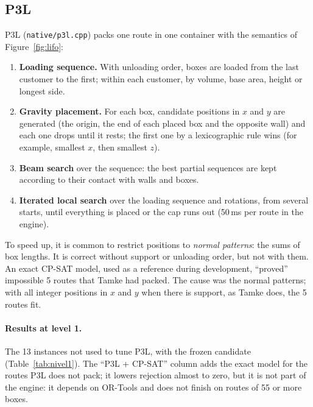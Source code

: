 \documentclass[11pt,a4paper]{article}
\newcommand{\tsl}[1]{\texttt{\small #1}}
\begin{document}
\subsection{P3L}

P3L (\tsl{native/p3l.cpp}) packs one route in one container with the semantics of
Figure~\ref{fig:lifo}:

\begin{enumerate}[leftmargin=1.5em]
\item \textbf{Loading sequence.} With unloading order, boxes are loaded from the last customer to the
first; within each customer, by volume, base area, height or longest side.
\item \textbf{Gravity placement.} For each box, candidate positions in $x$ and $y$ are generated (the
origin, the end of each placed box and the opposite wall) and each one drops until it rests; the first
one by a lexicographic rule wins (for example, smallest $x$, then smallest $z$).
\item \textbf{Beam search} over the sequence: the best partial sequences are kept according to their
contact with walls and boxes.
\item \textbf{Iterated local search} over the loading sequence and rotations, from several starts, until
everything is placed or the cap runs out (50\,ms per route in the engine).
\end{enumerate}

\begin{leccion}
To speed up, it is common to restrict positions to \emph{normal patterns}: the sums of box lengths. It is
correct without support or unloading order, but not with them. An exact CP-SAT model, used as a
reference during development, ``proved'' impossible 5 routes that Tamke had packed. The cause was the
normal patterns; with all integer positions in $x$ and $y$ when there is support, as Tamke does, the 5
routes fit.
\end{leccion}

\paragraph{Results at level 1.} The 13 instances not used to tune P3L, with the frozen candidate
(Table~\ref{tab:nivel1}). The ``P3L + CP-SAT'' column adds the exact model for the routes P3L does not
pack; it lowers rejection almost to zero, but it is not part of the engine: it depends on OR-Tools and
does not finish on routes of 55 or more boxes.
\end{document}
